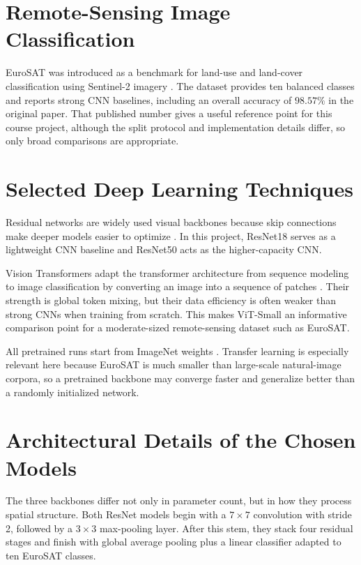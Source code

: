 \documentclass[11pt]{report}
\begin{document}
\section{Remote-Sensing Image Classification}
EuroSAT was introduced as a benchmark for land-use and land-cover classification using Sentinel-2 imagery \cite{helber2019}. The dataset provides ten balanced classes and reports strong CNN baselines, including an overall accuracy of \(98.57\%\) in the original paper. That published number gives a useful reference point for this course project, although the split protocol and implementation details differ, so only broad comparisons are appropriate.

\section{Selected Deep Learning Techniques}
Residual networks are widely used visual backbones because skip connections make deeper models easier to optimize \cite{he2016}. In this project, ResNet18 serves as a lightweight CNN baseline and ResNet50 acts as the higher-capacity CNN.

Vision Transformers adapt the transformer architecture from sequence modeling \cite{vaswani2017} to image classification by converting an image into a sequence of patches \cite{dosovitskiy2021}. Their strength is global token mixing, but their data efficiency is often weaker than strong CNNs when training from scratch. This makes ViT-Small an informative comparison point for a moderate-sized remote-sensing dataset such as EuroSAT.

All pretrained runs start from ImageNet weights \cite{deng2009}. Transfer learning is especially relevant here because EuroSAT is much smaller than large-scale natural-image corpora, so a pretrained backbone may converge faster and generalize better than a randomly initialized network.

\section{Architectural Details of the Chosen Models}
The three backbones differ not only in parameter count, but in how they process spatial structure. Both ResNet models begin with a \(7 \times 7\) convolution with stride 2, followed by a \(3 \times 3\) max-pooling layer. After this stem, they stack four residual stages and finish with global average pooling plus a linear classifier adapted to ten EuroSAT classes.
\end{document}
